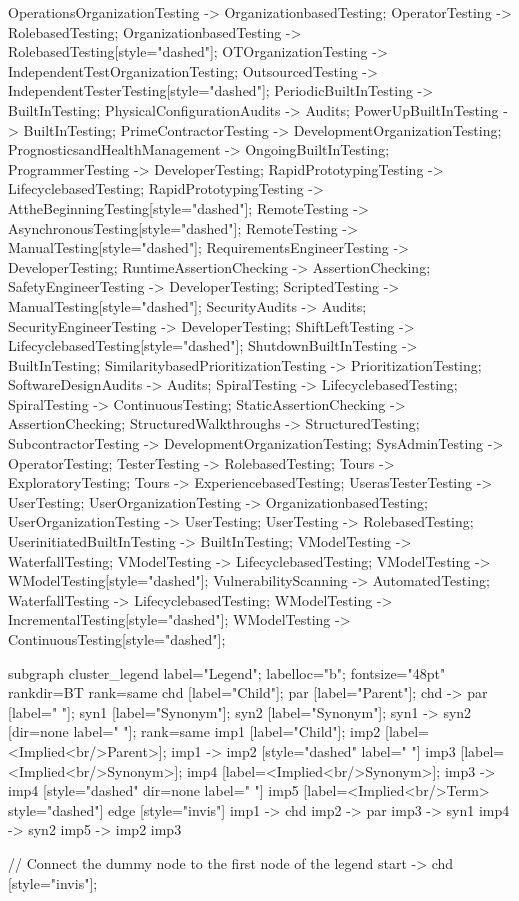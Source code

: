 \documentclass{article}
\begin{document}
{OperationsOrganizationTesting -> OrganizationbasedTesting;
OperatorTesting -> RolebasedTesting;
OrganizationbasedTesting -> RolebasedTesting[style="dashed"];
OTOrganizationTesting -> IndependentTestOrganizationTesting;
OutsourcedTesting -> IndependentTesterTesting[style="dashed"];
PeriodicBuiltInTesting -> BuiltInTesting;
PhysicalConfigurationAudits -> Audits;
PowerUpBuiltInTesting -> BuiltInTesting;
PrimeContractorTesting -> DevelopmentOrganizationTesting;
PrognosticsandHealthManagement -> OngoingBuiltInTesting;
ProgrammerTesting -> DeveloperTesting;
RapidPrototypingTesting -> LifecyclebasedTesting;
RapidPrototypingTesting -> AttheBeginningTesting[style="dashed"];
RemoteTesting -> AsynchronousTesting[style="dashed"];
RemoteTesting -> ManualTesting[style="dashed"];
RequirementsEngineerTesting -> DeveloperTesting;
RuntimeAssertionChecking -> AssertionChecking;
SafetyEngineerTesting -> DeveloperTesting;
ScriptedTesting -> ManualTesting[style="dashed"];
SecurityAudits -> Audits;
SecurityEngineerTesting -> DeveloperTesting;
ShiftLeftTesting -> LifecyclebasedTesting[style="dashed"];
ShutdownBuiltInTesting -> BuiltInTesting;
SimilaritybasedPrioritizationTesting -> PrioritizationTesting;
SoftwareDesignAudits -> Audits;
SpiralTesting -> LifecyclebasedTesting;
SpiralTesting -> ContinuousTesting;
StaticAssertionChecking -> AssertionChecking;
StructuredWalkthroughs -> StructuredTesting;
SubcontractorTesting -> DevelopmentOrganizationTesting;
SysAdminTesting -> OperatorTesting;
TesterTesting -> RolebasedTesting;
Tours -> ExploratoryTesting;
Tours -> ExperiencebasedTesting;
UserasTesterTesting -> UserTesting;
UserOrganizationTesting -> OrganizationbasedTesting;
UserOrganizationTesting -> UserTesting;
UserTesting -> RolebasedTesting;
UserinitiatedBuiltInTesting -> BuiltInTesting;
VModelTesting -> WaterfallTesting;
VModelTesting -> LifecyclebasedTesting;
VModelTesting -> WModelTesting[style="dashed"];
VulnerabilityScanning -> AutomatedTesting;
WaterfallTesting -> LifecyclebasedTesting;
WModelTesting -> IncrementalTesting[style="dashed"];
WModelTesting -> ContinuousTesting[style="dashed"];

subgraph cluster_legend {
    label="Legend";
    labelloc="b";
    fontsize="48pt"
    rankdir=BT
    {
        rank=same
        chd [label="Child"];
        par [label="Parent"];
        chd -> par [label="                "];
        syn1 [label="Synonym"];
        syn2 [label="Synonym"];
        syn1 -> syn2 [dir=none label="                "];
    }
    {
        rank=same
        imp1 [label="Child"];
        imp2 [label=<Implied<br/>Parent>];
        imp1 -> imp2 [style="dashed" label="                "]
        imp3 [label=<Implied<br/>Synonym>];
        imp4 [label=<Implied<br/>Synonym>];
        imp3 -> imp4 [style="dashed" dir=none label="                "]
    }
        imp5 [label=<Implied<br/>Term> style="dashed"]
    edge [style="invis"]
    imp1 -> chd
    imp2 -> par
    imp3 -> syn1
    imp4 -> syn2
imp5 -> { imp2 imp3 }
}

// Connect the dummy node to the first node of the legend
start -> chd [style="invis"];
}
\end{document}
